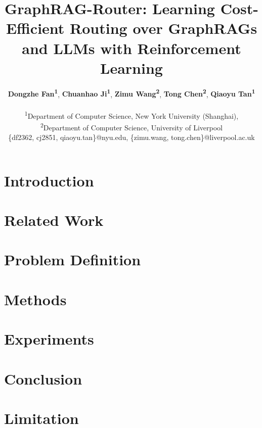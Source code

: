 \documentclass[11pt]{article}
\title{GraphRAG-Router: Learning Cost-Efficient Routing over GraphRAGs and LLMs with Reinforcement Learning}
\author{
 \textbf{Dongzhe Fan\textsuperscript{1}},
 \textbf{Chuanhao Ji\textsuperscript{1}},
 \textbf{Zimu Wang\textsuperscript{2}},
 \textbf{Tong Chen\textsuperscript{2}},
 \textbf{Qiaoyu Tan\textsuperscript{1}}
\\
\\
 \textsuperscript{1}Department of Computer Science, New York University (Shanghai),\\
 \textsuperscript{2}Department of Computer Science, University of Liverpool
\\
 \small{
 \{df2362, cj2851, qiaoyu.tan\}@nyu.edu,
 \{zimu.wang, tong.chen\}@liverpool.ac.uk
 }
}
\begin{document}
\maketitle
\begin{abstract}

\end{abstract}

\section{Introduction}


\section{Related Work}


\section{Problem Definition}


\section{Methods}


\section{Experiments}


\section{Conclusion}


\section*{Limitation}


%


\clearpage
\appendix

\end{document}
